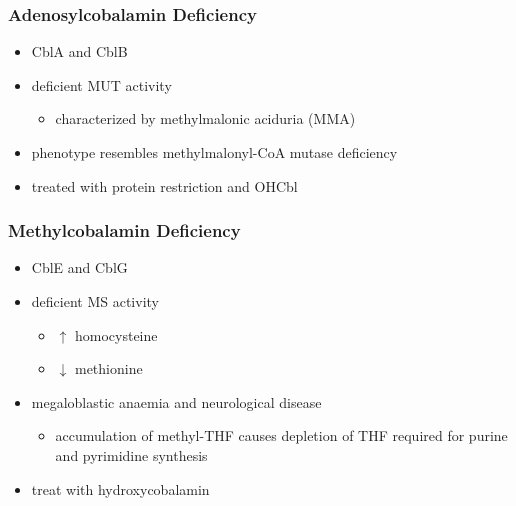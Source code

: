 \documentclass[12pt]{scrartcl}
\begin{document}
\subsubsection{Adenosylcobalamin Deficiency}
\label{sec:org0826e78}
\begin{itemize}
\item CblA and CblB
\item deficient MUT activity
\begin{itemize}
\item characterized by methylmalonic aciduria (MMA)
\end{itemize}
\item phenotype resembles methylmalonyl-CoA mutase deficiency
\item treated with protein restriction and OHCbl
\end{itemize}

\subsubsection{Methylcobalamin Deficiency}
\label{sec:org81bafee}
\begin{itemize}
\item CblE and CblG
\item deficient MS activity
\begin{itemize}
\item \(\uparrow\) homocysteine
\item \(\downarrow\) methionine
\end{itemize}
\item megaloblastic anaemia and neurological disease
\begin{itemize}
\item accumulation of methyl-THF causes depletion of THF required for
purine and pyrimidine synthesis
\end{itemize}
\item treat with hydroxycobalamin
\end{itemize}
\end{document}
